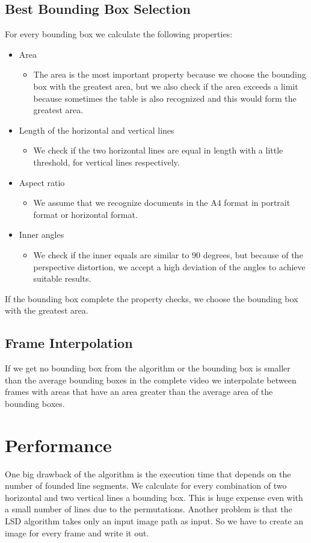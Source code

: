 \documentclass[english, paper=a4]{scrartcl}
\begin{document}
\subsection{Best Bounding Box Selection}
For every bounding box we calculate the following properties:
\begin{itemize}
\item Area
\begin{itemize}
\item The area is the most important property because we choose the bounding box with the greatest area, but we also check if the area exceeds a limit because sometimes the table is also recognized and this would form the greatest area. 
\end{itemize}
\item Length of the horizontal and vertical lines
\begin{itemize}
\item We check if the two horizontal lines are equal in length with a little threshold, for vertical lines respectively. 
\end{itemize}
\item Aspect ratio
\begin{itemize}
\item We assume that we recognize documents in the A4 format in portrait format or horizontal format.
\end{itemize}
\item Inner angles
\begin{itemize}
\item We check if the inner equals are similar to 90 degrees, but because of the perspective distortion, we accept a high deviation of the angles to achieve suitable results.
\end{itemize}
\end{itemize}

If the bounding box complete the property checks, we choose the bounding box with the greatest area. 

\subsection{Frame Interpolation}
If we get no bounding box from the algorithm or the bounding box is smaller than the average bounding boxes in the complete video we interpolate between frames with areas that have an area greater than the average area of the bounding boxes.

\section{Performance}
One big drawback of the algorithm is the execution time that depends on the number of founded line segments. We calculate for every combination of two horizontal and two vertical lines a bounding box. This is huge expense even with a small number of lines due to the permutations. Another problem is that the LSD algorithm takes only an input image path as input. So we have to create an image for every frame and write it out.
\end{document}
